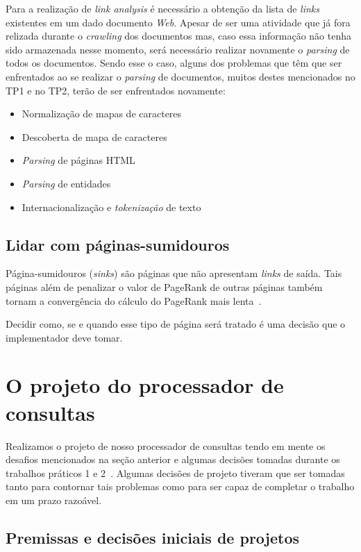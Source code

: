 \documentclass[10pt,twocolumn]{article}
\begin{document}
Para a realização de \emph{link analysis} é necessário a obtenção da
lista de \emph{links} existentes em um dado documento \emph{Web}.
Apesar de ser uma atividade que já fora relizada durante o
\emph{crawling} dos documentos mas, caso essa informação não tenha sido
armazenada nesse momento, será necessário realizar novamente o
\emph{parsing} de todos os documentos. Sendo esse o caso, alguns dos
problemas que têm que ser enfrentados ao se realizar o \emph{parsing} de
documentos, muitos destes mencionados no TP1 e no TP2, terão de ser
enfrentados novamente:
\begin{itemize}
\item Normalização de mapas de caracteres
\item Descoberta de mapa de caracteres
\item \emph{Parsing} de páginas HTML
\item \emph{Parsing} de entidades
\item Internacionalização e \emph{tokenização} de texto
\end{itemize}

\subsection{Lidar com páginas-sumidouros}

Página-sumidouros (\emph{sinks}) são páginas que não apresentam
\emph{links} de saída. Tais páginas além de penalizar o valor de
PageRank de outras páginas também tornam a convergência do cálculo do
PageRank mais lenta~\cite{haveliwala99efficient, page98pagerank}.

Decidir como, se e quando esse tipo de página será tratado é uma decisão
que o implementador deve tomar.


\section{O projeto do processador de consultas}\label{sec:projeto}

Realizamos o projeto de nosso processador de consultas tendo em mente os desafios
mencionados na seção anterior e algumas decisões tomadas durante os
trabalhos práticos 1 e 2~\cite{tp1,tp2}. Algumas decisões de projeto tiveram que
ser tomadas tanto para contornar tais problemas como para ser capaz de
completar o trabalho em um prazo razoável.


\subsection{Premissas e decisões iniciais de projetos}
\end{document}
